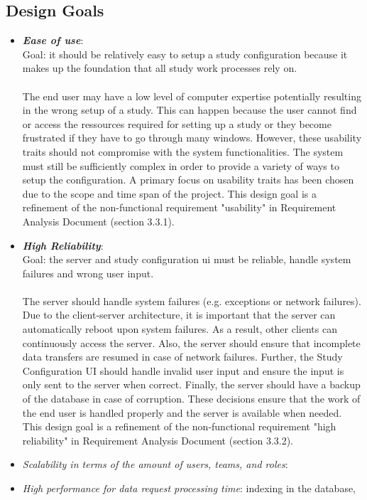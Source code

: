 \subsection{Design Goals}

\begin{itemize}
\item \textit{\bf{Ease of use}}: 
\\
Goal: it should be relatively easy to setup a study configuration because it makes up the foundation that all study work processes rely on. 
\\\\
The end user may have a low level of computer expertise potentially resulting in the wrong setup of a study.  This can happen because the user cannot find or access the ressources required for setting up a study or they become frustrated if they have to go through many windows. However, these usability traits should not compromise with the system functionalities. The system must still be sufficiently complex in order to provide a variety of ways to setup the configuration.  A primary focus on usability traits has been chosen due to the scope and time span of the project. This design goal is a refinement of the non-functional requirement  "usability" in Requirement Analysis Document  (section 3.3.1). 
\item \textit{\bf{High Reliability}}: 
\\
Goal: the server and study configuration ui must be reliable, handle system failures and wrong user input.
\\\\
The server should handle system failures (e.g. exceptions or network failures). Due to the client-server architecture, it is important that the server can automatically reboot upon system failures. As a result, other clients can continuously access the server. Also, the server should ensure that incomplete data transfers are resumed in case of network failures. Further, the Study Configuration UI should handle invalid user input and ensure the input is only sent to the server when correct. Finally, the server should have a backup of the database in case of corruption. These decisions ensure that the work of the end user is handled properly and the server is available when needed. This design goal is a refinement of the non-functional requirement "high reliability" in Requirement Analysis Document (section 3.3.2).  
\item \textit{Scalability in terms of the amount of users, teams, and roles}:
\item \textit{High performance for data request processing time}: indexing in the database, 
\end{itemize}